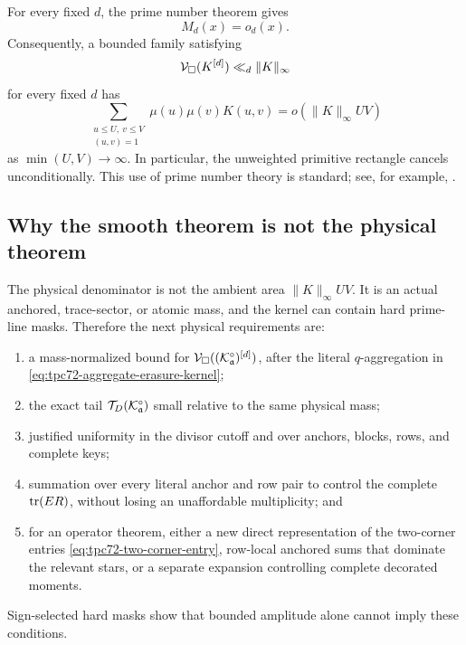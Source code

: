 For every fixed \(d\), the prime number theorem gives
\begin{equation}
 M_d(x)=o_d(x).
 \label{eq:tpc72-fixed-d-PNT}
\end{equation}
Consequently, a bounded family satisfying
\[
 \mathcal V_\square(K^{[d]})\ll_d\|K\|_\infty
\]
for every fixed \(d\) has
\begin{equation}
 \sum_{\substack{u\le U,\ v\le V\\(u,v)=1}}
 \mu(u)\mu(v)K(u,v)
 =
 o(\|K\|_\infty UV)
 \label{eq:tpc72-smooth-kernel-cancellation}
\end{equation}
as \(\min(U,V)\to\infty\).  In particular, the unweighted primitive
rectangle cancels unconditionally.  This use of prime number theory is
standard; see, for example, \citet{IwaniecKowalski2004}.

\subsection{Why the smooth theorem is not the physical theorem}

The physical denominator is not the ambient area
\(\|K\|_\infty UV\).  It is an actual anchored, trace-sector, or atomic
mass, and the kernel can contain hard prime-line masks.  Therefore the next
physical requirements are:
\begin{enumerate}[label=\textup{(V\arabic*)},leftmargin=3.5em]
 \item a mass-normalized bound for
       \(\mathcal V_\square((\mathcal K_{\mathfrak a}^{\circ})^{[d]})\), after the
       literal \(q\)-aggregation in
       \eqref{eq:tpc72-aggregate-erasure-kernel};
 \item the exact tail
       \(\mathcal T_D(\mathcal K_{\mathfrak a}^{\circ})\) small relative to the same
       physical mass;
 \item justified uniformity in the divisor cutoff and over anchors, blocks,
       rows, and complete keys;
 \item summation over every literal anchor and row pair to control the
       complete \(\operatorname{tr}(ER)\), without losing an unaffordable multiplicity;
       and
 \item for an operator theorem, either a new direct representation of the
       two-corner entries \eqref{eq:tpc72-two-corner-entry}, row-local
       anchored sums that dominate the relevant stars, or a separate
       expansion controlling complete decorated moments.
\end{enumerate}
Sign-selected hard masks show that bounded amplitude alone cannot imply
these conditions.

